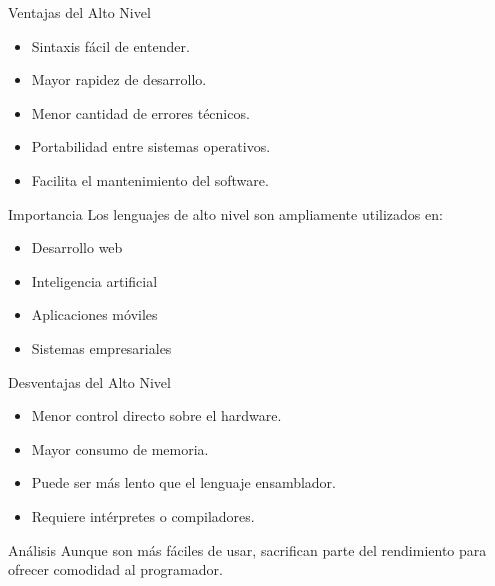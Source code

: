 \documentclass[10pt, aspectratio=169]{beamer}
\begin{document}
	\begin{frame}{Ventajas del Alto Nivel}
		
		\begin{itemize}
			\item Sintaxis fácil de entender.
			\item Mayor rapidez de desarrollo.
			\item Menor cantidad de errores técnicos.
			\item Portabilidad entre sistemas operativos.
			\item Facilita el mantenimiento del software.
		\end{itemize}
		
		\vspace{0.5cm}
		
		\begin{block}{Importancia}
			Los lenguajes de alto nivel son ampliamente utilizados en:
			\begin{itemize}
				\item Desarrollo web
				\item Inteligencia artificial
				\item Aplicaciones móviles
				\item Sistemas empresariales
			\end{itemize}
		\end{block}
		
	\end{frame}
	
	\begin{frame}{Desventajas del Alto Nivel}
		
		\begin{itemize}
			\item Menor control directo sobre el hardware.
			\item Mayor consumo de memoria.
			\item Puede ser más lento que el lenguaje ensamblador.
			\item Requiere intérpretes o compiladores.
		\end{itemize}
		
		\vspace{0.5cm}
		
		\begin{block}{Análisis}
			Aunque son más fáciles de usar, sacrifican parte del rendimiento para ofrecer comodidad al programador.
		\end{block}
		
	\end{frame}
	
\end{document}
